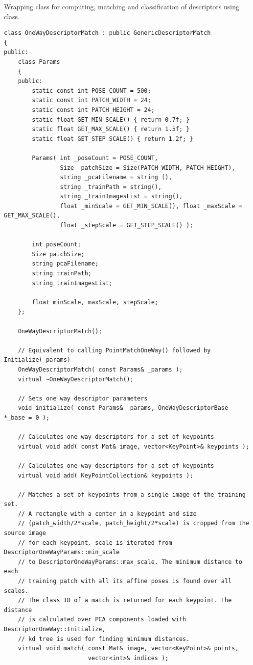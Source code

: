Wrapping class for computing, matching and classification of descriptors using  class.

\begin{lstlisting}
class OneWayDescriptorMatch : public GenericDescriptorMatch
{
public:
    class Params
    {
    public:
        static const int POSE_COUNT = 500;
        static const int PATCH_WIDTH = 24;
        static const int PATCH_HEIGHT = 24;
        static float GET_MIN_SCALE() { return 0.7f; }
        static float GET_MAX_SCALE() { return 1.5f; }
        static float GET_STEP_SCALE() { return 1.2f; }

        Params( int _poseCount = POSE_COUNT,
                Size _patchSize = Size(PATCH_WIDTH, PATCH_HEIGHT),
                string _pcaFilename = string (),
                string _trainPath = string(),
                string _trainImagesList = string(),
                float _minScale = GET_MIN_SCALE(), float _maxScale = GET_MAX_SCALE(),
                float _stepScale = GET_STEP_SCALE() );

        int poseCount;
        Size patchSize;
        string pcaFilename;
        string trainPath;
        string trainImagesList;

        float minScale, maxScale, stepScale;
    };

    OneWayDescriptorMatch();

    // Equivalent to calling PointMatchOneWay() followed by Initialize(_params)
    OneWayDescriptorMatch( const Params& _params );
    virtual ~OneWayDescriptorMatch();

    // Sets one way descriptor parameters
    void initialize( const Params& _params, OneWayDescriptorBase *_base = 0 );

    // Calculates one way descriptors for a set of keypoints
    virtual void add( const Mat& image, vector<KeyPoint>& keypoints );

    // Calculates one way descriptors for a set of keypoints
    virtual void add( KeyPointCollection& keypoints );

    // Matches a set of keypoints from a single image of the training set.
    // A rectangle with a center in a keypoint and size 
    // (patch_width/2*scale, patch_height/2*scale) is cropped from the source image
    // for each keypoint. scale is iterated from DescriptorOneWayParams::min_scale
    // to DescriptorOneWayParams::max_scale. The minimum distance to each 
    // training patch with all its affine poses is found over all scales.
    // The class ID of a match is returned for each keypoint. The distance 
    // is calculated over PCA components loaded with DescriptorOneWay::Initialize,
    // kd tree is used for finding minimum distances.
    virtual void match( const Mat& image, vector<KeyPoint>& points, 
	                    vector<int>& indices );


\end{lstlisting}
